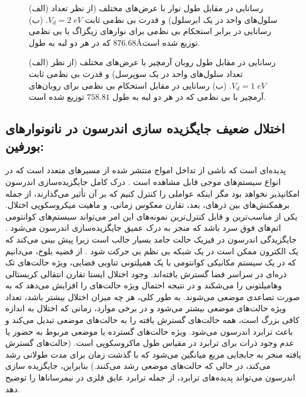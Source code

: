     \begin{figure}[!ht]
      \centering
      
      \caption{(الف) رسانایی در مقابل طول نوار با عرض‌های مختلف (از نظر تعداد سلول‌های واحد در یک ابرسلول) و قدرت بی نظ‌‌می‌‌ ثابت $V_d=2\;eV$. (ب) رسانایی در برابر استحکام بی نظ‌‌می‌‌ برای نوارهای زیگزاگ با بی نظ‌‌می‌‌ که در هر دو لبه به طول $876.68$\AA توزیع شده است.}
      \label{zigzag-width-strangth}
    \end{figure}  

\begin{figure}[!ht]
    \centering
    
    \caption{(الف) رسانایی در مقابل طول روبان آرمچیر با عرض‌های مختلف (از نظر تعداد سلول‌های واحد در یک سوپرسل) و قدرت بی نظ‌‌می‌‌ ثابت $V_d=1\;eV$. (ب) رسانایی در مقابل استحکام بی نظ‌‌می‌‌ برای روبان‌های آرمچیر با بی نظ‌‌می‌‌ که در هر دو لبه به طول \lr{\AA}$758.81$ توزیع شده است.}
    \label{armchair-width-strangth}
  \end{figure}

\subsection{اختلال ضعیف جایگزیده سازی اندرسون در نانونوارهای بورفین:}
پدیده‌ای است که ناشی از تداخل امواج منتشر شده از مسیرهای متعدد است که در انواع سیستم‌های موجی قابل مشاهده است \cite{Strybulevych2008,Chabe2008,Ying2016,Manai2015}. درک کامل جایگزیده‌سازی اندرسون امکانپذیر نخواهد بود مگر اینکه عواملی را کنترل کنیم که بر آن تأثیر ‌می‌گذارند، از جمله برهمکنش‌های بین ذرهای، بعد، تقارن معکوس زمانی، و ماهیت ‌میکروسکوپی اختلال. یکی از مناسب‌ترین و قابل کنترل‌ترین نمونه‌های این امر ‌می‌تواند سیستم‌های کوانتو‌‌می اتم‌های فوق سرد باشد که منجر به درک عمیق جایگزیده‌سازی اندرسون ‌می‌شود \cite{Georgescu2014}. جایگزیدگی اندرسون در فیزیک حالت جامد بسیار جالب است زیرا پیش بینی ‌‌می‌‌کند که یک الکترون ممکن است در یک شبکه بی نظم بی حرکت شود \cite{Georgescu2014}. از قضیه بلوخ، ‌می‌‌دانیم که در یک سیستم مکانیکی کوانتو‌‌می‌‌ با یک همیلتونی تناوبی فضایی، ویژه حالت‌های تک ذره‌ای در سراسر فضا گسترش یافته‌اند. وجود اختلال ایستا تقارن انتقالی کریستالی و‌ها‌میلتونی را ‌‌می‌‌شکند و در نتیجه احتمال ویژه حالت‌های را افزایش ‌‌می‌‌دهد که به صورت تصاعدی موضعی ‌‌می‌‌شوند. به طور کلی، هر چه ‌میزان اختلال بیشتر باشد، تعداد ویژه حالت‌های موضعی بیشتر  ‌می‌شود و در برخی موارد، زمانی که اختلال به اندازه کافی بزرگ است، همه حالت‌های گسترش یافته را به حالت‌های موضعی تبدیل ‌می‌کند و باعث ترابرد اندرسون ‌می‌‌شود. ویژه حالت‌های گسترده یا موضعی مربوط به حضور یا عدم وجود ذرات برای ترابرد در مقیاس طول ماکروسکوپی است. (حالت‌های گسترش یافته منجر به جابجایی مربع ‌میانگین ‌می‌شود که با گذشت زمان برای مدت طولانی رشد ‌می‌کند، در حالی که حالت‌های موضعی رشد ‌می‌‌کنند.) بنابراین، جایگزیده سازی اندرسون ‌می‌‌تواند پدیده‌های ترابرد، از جمله ترابرد عایق فلزی در نیمرساناها را توضیح دهد.

